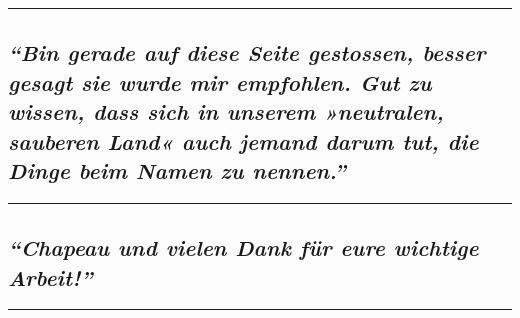 \begin{center}\rule{0.5\linewidth}{\linethickness}\end{center}

\hypertarget{bin-gerade-auf-diese-seite-gestossen-besser-gesagt-sie-wurde-mir-empfohlen-gut-zu-wissen-dass-sich-in-unserem-neutralen-sauberen-land-auch-jemand-darum-tut-die-dinge-beim-namen-zu-nennen}{%
\subsection{\texorpdfstring{\emph{``Bin gerade auf diese Seite
gestossen, besser gesagt sie wurde mir empfohlen. Gut zu wissen, dass
sich in unserem »neutralen, sauberen Land« auch jemand darum tut, die
Dinge beim Namen zu
nennen.''}}{``Bin gerade auf diese Seite gestossen, besser gesagt sie wurde mir empfohlen. Gut zu wissen, dass sich in unserem »neutralen, sauberen Land« auch jemand darum tut, die Dinge beim Namen zu nennen.''}}\label{bin-gerade-auf-diese-seite-gestossen-besser-gesagt-sie-wurde-mir-empfohlen-gut-zu-wissen-dass-sich-in-unserem-neutralen-sauberen-land-auch-jemand-darum-tut-die-dinge-beim-namen-zu-nennen}}

\begin{center}\rule{0.5\linewidth}{\linethickness}\end{center}

\hypertarget{chapeau-und-vielen-dank-fuxfcr-eure-wichtige-arbeit}{%
\subsection{\texorpdfstring{\emph{``Chapeau und vielen Dank für eure
wichtige
Arbeit!''}}{``Chapeau und vielen Dank für eure wichtige Arbeit!''}}\label{chapeau-und-vielen-dank-fuxfcr-eure-wichtige-arbeit}}

\begin{center}\rule{0.5\linewidth}{\linethickness}\end{center}

